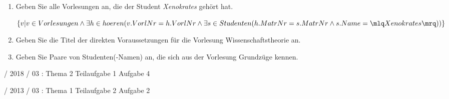 \documentclass{lehramt-informatik}
\begin{document}
\begin{enumerate}
\item Geben Sie alle Vorlesungen an, die der Student
\emph{Xenokrates} gehört hat.

\begin{antwort}[muster]
$\{
  v |
  v \in Vorlesungen \land
  \exists h \in hoeren(
    v.VorlNr = h.VorlNr \land
    \exists s \in Studenten(
      h.MatrNr = s.MatrNr \land s.Name = \mlq Xenokrates \mrq
    )
  )
\}
$
\end{antwort}

\item Geben Sie die Titel der direkten Voraussetzungen für die
Vorlesung Wissenschaftstheorie an.

\item Geben Sie Paare von Studenten(-Namen) an, die sich aus
der Vorlesung Grundzüge kennen.

\end{enumerate}

%

 / 2018 / 03 : Thema 2 Teilaufgabe 1 Aufgabe 4

%

 / 2013 / 03 : Thema 1 Teilaufgabe 2 Aufgabe 2

\literatur
\end{document}
